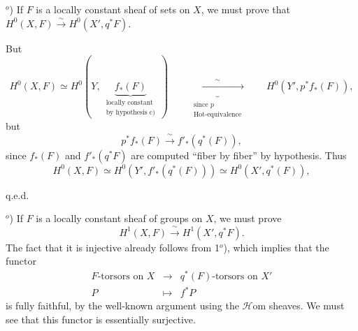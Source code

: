 \documentclass[11pt]{article}
\newcommand{\msp}[1]{\marginpar{\footnotesize [#1]}}
\begin{document}

$^o$) If $F$ is a locally constant sheaf of sets on $X$, we must prove that $H^0(X,F) \xrightarrow{\sim} H^0(X', q^*F)$.

\msp{page 128}

\noindent But
\[
H^0(X,F) \simeq H^0(Y,\ \underbrace{f_*(F)}_{\substack{\text{locally constant}\\ \text{by hypothesis c)}}}\ )
\qquad
\underbrace{\xrightarrow{\qquad\sim\qquad}}_{\substack{\text{since } p\\ \text{Hot-equivalence}}}
\qquad
H^0(Y', p^* f_*(F)),
\]
but
\[
p^* f_*(F) \xrightarrow{\ \sim\ } f'_*(q^*(F)),
\]
since $f_*(F)$ and $f'_*(q^*F)$ are computed ``fiber by fiber'' by hypothesis. Thus
\[
H^0(X,F) \simeq H^0(Y', f'_*(q^*(F))) \simeq H^0(X', q^*(F)),
\]

\hfill q.e.d.

$^o$) If $F$ is a locally constant sheaf of groups on $X$, we must prove %
\[
H^1(X,F) \xrightarrow{\ \sim\ } H^1(X', q^*F).
\]
The fact that it is injective already follows from 1$^o$), which implies that the functor
\[
\begin{array}{rcl}
F\text{-torsors on } X & \longrightarrow & q^*(F)\text{-torsors on } X' \\
P & \longmapsto & f^*P %
\end{array}
\]
is fully faithful, by the well-known argument using the $\mathcal{H}$om sheaves. We must see that this functor is essentially surjective.

\msp{page 129}
\end{document}
